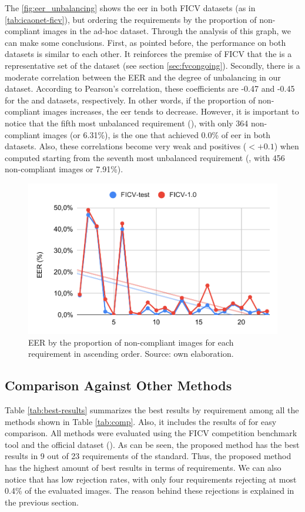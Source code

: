 The \autoref{fig:eer_unbalancing} shows the \acs{eer} in both FICV datasets (as in \autoref{tab:icaonet-ficv}), but ordering the requirements by the proportion of non-compliant images in the ad-hoc dataset. Through the analysis of this graph, we can make some conclusions. First, as pointed before, the performance on both datasets is similar to each other. It reinforces the premise of FICV that the \ficvtest is a representative set of the \ficvofficial dataset (see section \ref{sec:fvcongoing}). Secondly, there is a moderate correlation between the EER and the degree of unbalancing in our dataset. According to Pearson's correlation, these coefficients are -0.47 and -0.45 for the \ficvtest and \ficvofficial datasets, respectively. In other words, if the proportion of non-compliant images increases, the \acs{eer} tends to decrease. However, it is important to notice that the fifth most unbalanced requirement (\citeReq{\veiloverface}), with only 364 non-compliant images (or 6.31\%), is the one that achieved 0.0\% of \acs{eer} in both datasets. Also, these correlations become very weak and positives ($< +0.1$) when computed starting from the seventh most unbalanced requirement (\citeReq{\toodarklight}, with 456 non-compliant images or 7.91\%).

\begin{figure}[ht]
\centering
\includegraphics[width=0.8\linewidth]{images/graphs/eer_unbalancing.pdf}
\caption{EER by the proportion of non-compliant images for each requirement in ascending order. Source: own elaboration.}
\label{fig:eer_unbalancing}
\end{figure}

\subsection{Comparison Against Other Methods}

Table \ref{tab:best-results} summarizes the best results by requirement among all the methods shown in Table \ref{tab:comp}. Also, it includes the results of \methodname for easy comparison. All methods were evaluated using the FICV competition benchmark tool and the official dataset (\ficvofficial). As can be seen, the proposed method has the best results in 9 out of 23 requirements of the \icao standard. Thus, the proposed method has the highest amount of best results in terms of requirements. We can also notice that \methodname has low rejection rates, with only four requirements rejecting at most 0.4\% of the evaluated images. The reason behind these rejections is explained in the previous section. 


